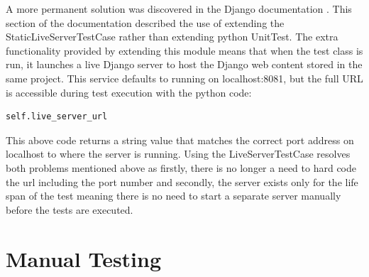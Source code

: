 A more permanent solution was discovered in the Django documentation \cite{django_live_server_test}. This section of the documentation described the use of extending the StaticLiveServerTestCase rather than extending python UnitTest. The extra functionality provided by extending this module means that when the test class is run, it launches a live Django server to host the Django web content stored in the same project. This service defaults to running on localhost:8081, but the full URL is accessible during test execution with the python code:
\begin{verbatim}
self.live_server_url
\end{verbatim}
This above code returns a string value that matches the correct port address on localhost to where the server is running. Using the LiveServerTestCase resolves both problems mentioned above as firstly, there is no longer a need to hard code the url including the port number and secondly, the server exists only for the life span of the test meaning there is no need to start a separate server manually before the tests are executed.

\section{Manual Testing}
